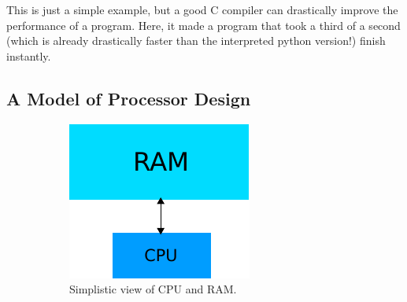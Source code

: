 \documentclass[12pt]{article}
\begin{document}
This is just a simple example, but a good C compiler can drastically improve the performance of a
program. Here, it made a program that took a third of a second (which is already drastically faster than
the interpreted python version!) finish instantly.

\subsection{A Model of Processor Design}



\begin{figure}[h]
\begin{subfigure}{0.4\textwidth}
\includegraphics[width=\linewidth]{ram-cpu-simple.pdf}
\caption{Simplistic view of CPU and RAM.} \label{fig:1a}
\end{subfigure}
\hfill
\begin{subfigure}{0.4\textwidth}

\end{subfigure}
\end{figure}
\end{document}
